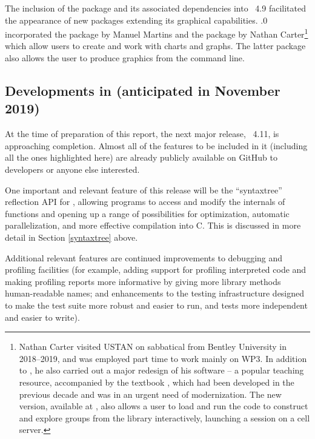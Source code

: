 The inclusion of the  package and its associated 
dependencies into \GAP~4.9 facilitated the appearance of new packages
extending its graphical capabilities. .0 incorporated 
the  package \cite{Francy} by Manuel Martins and
the  package \cite{JupyterViz} by 
Nathan Carter\footnote{Nathan Carter visited USTAN on sabbatical from
Bentley University in 2018--2019, and was employed part time to work
mainly on WP3. In addition to , he also carried out a major redesign
of his  software -- a popular teaching resource, 
accompanied by the textbook \cite{Carter-book}, which had been developed
in the previous decade and was in an
urgent need of modernization. The new  version, available
at \cite{GroupExplorer}, also allows a user to load and run the \GAP code
to construct and explore groups from the  library
interactively, launching a \GAP session on a \SageMath cell server.
}
which allow users to create and work with charts and graphs. The latter
package also allows the user to produce graphics from the \GAP command line.


\subsection{Developments in  (anticipated in November 2019)}\label{gap-4.11}



At the time of preparation of this report, the next major release,
\GAP~4.11,
is approaching completion. Almost all of the features to be
included in it (including all the ones highlighted here) are already
publicly  available on GitHub to developers or anyone else interested.

One important and relevant feature of this release will be the ``syntaxtree'' reflection
API for \GAP, allowing \GAP programs to access and modify the internals of \GAP
functions and opening up a range of possibilities for optimization, automatic
parallelization, and more effective compilation into C. This is
discussed in more detail in Section \ref{syntaxtree} above. 

Additional relevant features are continued improvements to debugging and
profiling facilities (for example,
adding support for profiling interpreted code
and 
making profiling reports more informative by 
giving more library methods human-readable names;
and enhancements to the testing infrastructure designed to make the
test suite more robust and easier to run, and tests more independent
and easier to write).

